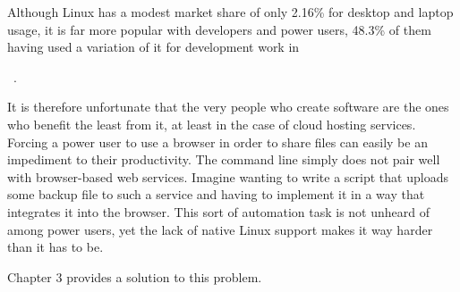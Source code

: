 Although Linux has a modest market share of only 2.16\% for desktop and laptop usage, it is far more popular with developers and power users, 48.3\% of them having used a variation of it for development work in \date{2018}~\cite{linux_market_share,stack_overflow_developer_survey_results}.

It is therefore unfortunate that the very people who create software are the ones who benefit the least from it, at least in the case of cloud hosting services. Forcing a power user to use a browser in order to share files can easily be an impediment to their productivity. The command line simply does not pair well with browser-based web services. Imagine wanting to write a script that uploads some backup file to such a service and having to implement it in a way that integrates it into the browser. This sort of automation task is not unheard of among power users, yet the lack of native Linux support makes it way harder than it has to be.

Chapter 3 provides a solution to this problem.
